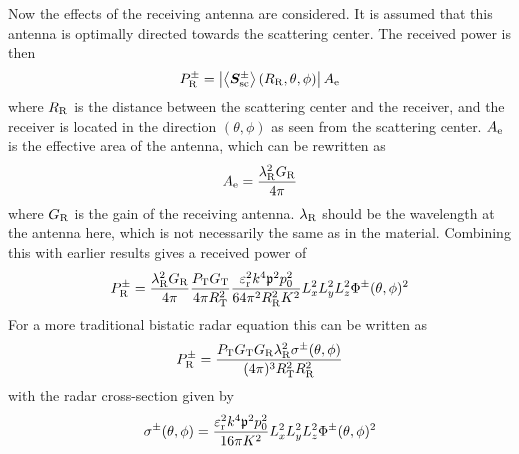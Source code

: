 \documentclass[11pt,twoside]{eitExjobb}
\begin{document}
	Now the effects of the receiving antenna are considered. It is assumed that this antenna is optimally directed towards the scattering center. The received power is then
	\begin{equation*}
		P_{\mathrm{R}}^\pm = \left| \left< \bm{S}_{\mathrm{sc}}^\pm \right> (R_{\mathrm{R}}, \theta, \phi) \right| A_{\mathrm{e}}
	\end{equation*}
	where $R_{\mathrm{R}}$ is the distance between the scattering center and the receiver, and the receiver is located in the direction $(\theta,\phi)$ as seen from the scattering center. $A_{\mathrm{e}}$ is the effective area of the antenna, which can be rewritten as
	\begin{equation*}
		A_{\mathrm{e}} = \frac{\lambda_{\mathrm{R}}^2 G_{\mathrm{R}}}{4\pi}
	\end{equation*}
	where $G_{\mathrm{R}}$ is the gain of the receiving antenna. $\lambda_{\mathrm{R}}$ should be the wavelength at the antenna here, which is not necessarily the same as in the material. Combining this with earlier results gives a received power of
	\begin{equation*}
		P_{\mathrm{R}}^\pm = \frac{\lambda_{\mathrm{R}}^2 G_{\mathrm{R}}}{4\pi} \frac{P_{\mathrm{T}} G_{\mathrm{T}}}{4\pi R_{\mathrm{T}}^2} \frac{\varepsilon_{\mathrm{r}}^2 k^4 \mathfrak{p}^2 p_0^2}{64\pi^2 R_{\mathrm{R}}^2 K^2} L_{x}^2 L_{y}^2 L_{z}^2 \Phi^\pm (\theta,\phi)^2
	\end{equation*}
	For a more traditional bistatic radar equation \cite{Richards2012} this can be written as
	\begin{equation*}
		P_{\mathrm{R}}^\pm = \frac{P_{\mathrm{T}} G_{\mathrm{T}} G_{\mathrm{R}} \lambda_{\mathrm{R}}^2 \sigma^\pm (\theta,\phi)}{(4\pi)^3 R_{\mathrm{T}}^2 R_{\mathrm{R}}^2}
	\end{equation*}
	with the radar cross-section given by
	\begin{equation*}
		\sigma^\pm (\theta, \phi) = \frac{\varepsilon_{\mathrm{r}}^2 k^4 \mathfrak{p}^2 p_0^2}{16\pi K^2} L_{x}^2 L_{y}^2 L_{z}^2 \Phi^\pm (\theta,\phi)^2
	\end{equation*}
	
\end{document}
